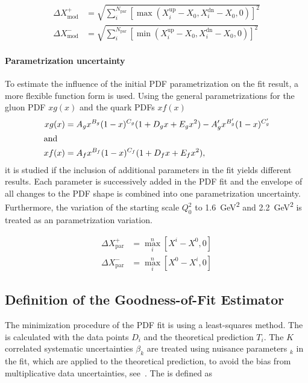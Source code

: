 \begin{align*}
  \Delta X^+_{\mathrm{mod}} &= \sqrt{\sum_i^{N_{\mathrm{par}}} \left[ \max(X_i^{\mathrm{up}}
    -X_0, X_i^{\mathrm{dn}} - X_0, 0)\right]^2}\\
    \Delta X^-_{\mathrm{mod}} &= \sqrt{\sum_i^{N_{\mathrm{par}}} \left[ \min(X_i^{\mathrm{up}} - X_0, X_i^{\mathrm{dn}} - X_0,0)\right]^2}
\end{align*}

\paragraph{Parametrization uncertainty}

To estimate the influence of the initial PDF parametrization on the fit result, a
more flexible function form is used. Using the general
parametrizations for the gluon PDF $xg(x)$ and the quark PDFs $xf(x)$
%
\begin{align*}
   xg(x) &= A_g x^{B_g} (1-x)^{C_g} (1  + D_g x + E_g x^2) - A'_g x^{B'_g} (1-x)^{C'_g}\\
\intertext{and}
   xf(x) &= A_{f}  x^{B_{f}} (1-x)^{C_{f}} (1 + D_{f}x + E_{f}x^2),
\end{align*}
%
it is studied if the inclusion of additional parameters in the fit yields
different results. Each parameter is successively added in the PDF fit and the
envelope of all changes to the PDF shape is combined into one parametrization
uncertainty. Furthermore, the variation of the starting scale $Q_0^2$ to
\SI{1.6}{\GeV\squared} and \SI{2.2}{\GeV\squared} is treated as an 
parametrization variation.

\begin{align*}
  \Delta X^+_{\mathrm{par}} &= \max_{i}^{n} \left[ X^i - X^0, 0 \right]\\
  \Delta X^-_{\mathrm{par}} &= \max_{i}^{n} \left[ X^0 - X^i, 0 \right]
\end{align*}


\subsection{Definition of the Goodness-of-Fit Estimator}
\label{sec:chi2_definition}

The minimization procedure of the PDF fit is using a least-squares method. The \chisq is
calculated with the data points $D_i$ and the theoretical prediction $T_i$. The
$K$  correlated systematic uncertainties $\beta_{k}$ are treated using nuisance parameters
$_k$ in the fit, which are applied to the theoretical prediction, to avoid the bias from
multiplicative data uncertainties, see~\cite{Lyons:1989gh}. The \chisq is
defined as

